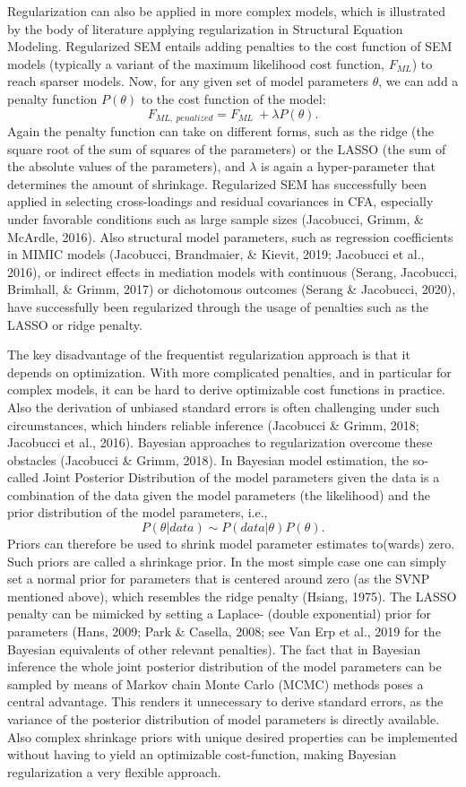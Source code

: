 \documentclass[
  man, donotrepeattitle,floatsintext]{apa6}
\begin{document}
Regularization can also be applied in more complex models, which is illustrated by the body of literature applying regularization in Structural Equation Modeling. Regularized SEM entails adding penalties to the cost function of SEM models (typically a variant of the maximum likelihood cost function, \(F_{ML}\)) to reach sparser models. Now, for any given set of model parameters \(\theta\), we can add a penalty function \(P(\theta)\) to the cost function of the model:
\[F_{ML, \ penalized} = F_{ML} \ + \lambda P(\theta).\]
Again the penalty function can take on different forms, such as the ridge (the square root of the sum of squares of the parameters) or the LASSO (the sum of the absolute values of the parameters), and \(\lambda\) is again a hyper-parameter that determines the amount of shrinkage. Regularized SEM has successfully been applied in selecting cross-loadings and residual covariances in CFA, especially under favorable conditions such as large sample sizes (Jacobucci, Grimm, \& McArdle, 2016). Also structural model parameters, such as regression coefficients in MIMIC models (Jacobucci, Brandmaier, \& Kievit, 2019; Jacobucci et al., 2016), or indirect effects in mediation models with continuous (Serang, Jacobucci, Brimhall, \& Grimm, 2017) or dichotomous outcomes (Serang \& Jacobucci, 2020), have successfully been regularized through the usage of penalties such as the LASSO or ridge penalty.

The key disadvantage of the frequentist regularization approach is that it depends on optimization. With more complicated penalties, and in particular for complex models, it can be hard to derive optimizable cost functions in practice. Also the derivation of unbiased standard errors is often challenging under such circumstances, which hinders reliable inference (Jacobucci \& Grimm, 2018; Jacobucci et al., 2016). Bayesian approaches to regularization overcome these obstacles (Jacobucci \& Grimm, 2018). In Bayesian model estimation, the so-called Joint Posterior Distribution of the model parameters given the data is a combination of the data given the model parameters (the likelihood) and the prior distribution of the model parameters, i.e.,
\[P({\theta} | data) \sim  P(data | \theta) P(\theta) .\]
Priors can therefore be used to shrink model parameter estimates to(wards) zero. Such priors are called a shrinkage prior. In the most simple case one can simply set a normal prior for parameters that is centered around zero (as the SVNP mentioned above), which resembles the ridge penalty (Hsiang, 1975). The LASSO penalty can be mimicked by setting a Laplace- (double exponential) prior for parameters (Hans, 2009; Park \& Casella, 2008; see Van Erp et al., 2019 for the Bayesian equivalents of other relevant penalties). The fact that in Bayesian inference the whole joint posterior distribution of the model parameters can be sampled by means of Markov chain Monte Carlo (MCMC) methods poses a central advantage. This renders it unnecessary to derive standard errors, as the variance of the posterior distribution of model parameters is directly available. Also complex shrinkage priors with unique desired properties can be implemented without having to yield an optimizable cost-function, making Bayesian regularization a very flexible approach.
\end{document}
